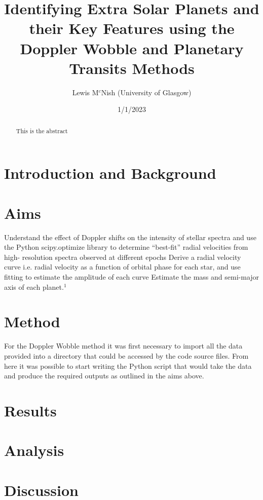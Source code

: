 \documentclass[]{article}
\title{\textbf{Identifying Extra Solar Planets and their Key Features using the Doppler Wobble and Planetary Transits Methods}}
\author{Lewis M$^{c}$Nish (University of Glasgow)}
\date{1/1/2023}
\begin{document}
\maketitle

\begin{abstract}
This is the abstract

\end{abstract}
\newpage



\twocolumn
\section*{Introduction and Background}

\section*{Aims}
Understand the effect of Doppler shifts on the intensity of stellar spectra and use the Python scipy.optimize library to determine “best-fit” radial velocities from high- resolution spectra observed at different epochs
Derive a radial velocity curve i.e. radial velocity as a function of orbital phase for each star, and use fitting to estimate the amplitude of each curve 
Estimate the mass and semi-major axis of each planet.$^1$

\section*{Method}
For the Doppler Wobble method it was first necessary to import all the data provided into a directory that could be accessed by the code source files. From here it was possible to start writing the Python script that would take the data and produce the required outputs as outlined in the aims above.





\section*{Results}

\section*{Analysis}
\section*{Discussion}
\end{document}

